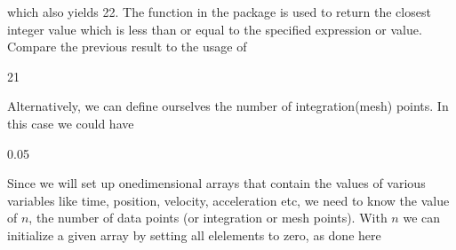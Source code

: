 \documentclass[letterpaper,10pt,english]{sphinxmanual}
\begin{document}
which also yields 22. The   function in the  package
is used to return the closest integer value which is less than or equal to the specified expression or value.
Compare the previous result to the usage of 

\begin{sphinxVerbatim}[commandchars=\\\{\}]
   
  
\end{sphinxVerbatim}

\begin{sphinxVerbatim}[commandchars=\\\{\}]
21
\end{sphinxVerbatim}

Alternatively, we can define ourselves the number of integration(mesh) points. In this case we could have

\begin{sphinxVerbatim}[commandchars=\\\{\}]
  
  
  
  
\end{sphinxVerbatim}

\begin{sphinxVerbatim}[commandchars=\\\{\}]
0.05
\end{sphinxVerbatim}

Since we will set up one\sphinxhyphen{}dimensional arrays that contain the values of
various variables like time, position, velocity, acceleration etc, we
need to know the value of \(n\), the number of data points (or
integration or mesh points).  With \(n\) we can initialize a given array
by setting all elelements to zero, as done here

\begin{sphinxVerbatim}[commandchars=\\\{\}]
  
\end{sphinxVerbatim}
\end{document}
